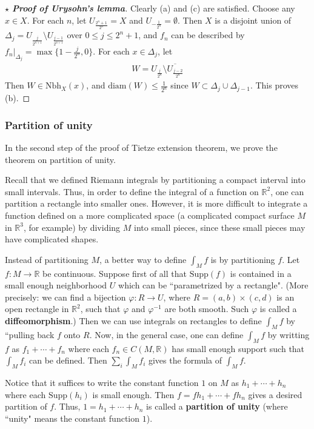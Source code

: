 \documentclass[12pt,b5paper,notitlepage]{article}
\theoremstyle{definition}
\theoremstyle{plain}
\newcommand{\ovl}{\overline}
\newcommand{\Rbb}{\mathbb R}
\newcommand{\Supp}{\mathrm{Supp}}
\newcommand{\Nbh}{\mathrm{Nbh}}
\newcommand{\diam}{\mathrm{diam}}
\numberwithin{equation}{section}
\begin{document}
\begin{proof}[$\star$ \textbf{Proof of Urysohn's lemma}]
Clearly (a) and (c) are satisfied. Choose any $x\in X$. For each $n$, let $U_{\frac {2^n+1}{2^n}}=X$ and $U_{-\frac 1{2^n}}=\emptyset$. Then $X$ is a disjoint  union of $\Delta_j=U_{\frac j{2^{n+1}}}\setminus U_{\frac{j-1}{2^{n+1}}}$ over $0\leq j\leq 2^n+1$, and $f_n$ can be described by $f_n|_{\Delta_j}=\max\{1-\frac j{2^n},0\}$. For each $x\in \Delta_j$, let
\begin{align*}
W=U_{\frac{j}{2^n}}\setminus\ovl{U_{\frac{j-2}{2^n}} }
\end{align*}
Then $W\in\Nbh_X(x)$, and $\diam(W)\leq \frac 1{2^n}$ since $W\subset \Delta_j\cup\Delta_{j-1}$. This proves (b).
\end{proof}



\subsubsection{Partition of unity}\label{lb467}


In the second step of the proof of Tietze extension theorem, we prove the theorem on partition of unity.

Recall that we defined Riemann integrals by partitioning a compact interval into small intervals. Thus, in order to define the integral of a function on $\Rbb^2$, one can partition a rectangle into smaller ones. However, it is more difficult to integrate a function defined on a more complicated space (a complicated compact surface $M$ in $\Rbb^3$, for example) by dividing $M$ into small pieces, since these small pieces may have complicated shapes.

Instead of partitioning $M$, a better way to define $\int_Mf$ is by partitioning $f$. Let $f:M\rightarrow\Rbb$ be continuous. Suppose first of all that $\Supp(f)$ is contained in a small enough neighborhood $U$ which can be ``parametrized by a rectangle". (More precisely: we can find a bijection $\varphi:R\rightarrow U$, where $R=(a,b)\times(c,d)$ is an open rectangle in $\Rbb^2$, such that $\varphi$ and $\varphi^{-1}$ are both smooth. Such $\varphi$ is called a \textbf{diffeomorphism}.) Then we can use integrals on rectangles to define $\int_Mf$ by ``pulling back $f$ onto $R$. Now, in the general case, one can define $\int_Mf$ by writting $f$ as $f_1+\cdots+f_n$ where each $f_n\in C(M,\Rbb)$ has small enough support such that $\int_Mf_i$ can be defined. Then $\sum_i\int_Mf_i$ gives the formula of $\int_Mf$. 

Notice that it suffices to write the constant function $1$ on $M$ as $h_1+\cdots+h_n$ where each $\Supp(h_i)$ is small enough. Then $f=fh_1+\cdots+fh_n$ gives a desired partition of $f$. Thus, $1=h_1+\cdots+h_n$ is called a \textbf{partition of unity} (where ``unity" means the constant function $1$).
\end{document}
